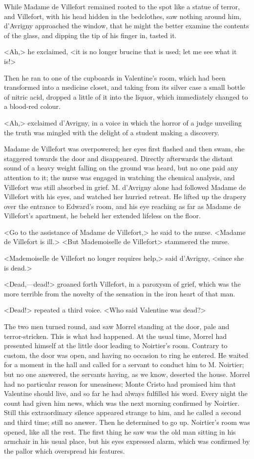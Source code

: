  While Madame de Villefort remained rooted to the spot like a statue of terror, and Villefort, with his head hidden in the bedclothes, saw nothing around him, d'Avrigny approached the window, that he might the better examine the contents of the glass, and dipping the tip of his finger in, tasted it. 

 <Ah,> he exclaimed, <it is no longer brucine that is used; let me see what it is!> 

 Then he ran to one of the cupboards in Valentine's room, which had been transformed into a medicine closet, and taking from its silver case a small bottle of nitric acid, dropped a little of it into the liquor, which immediately changed to a blood-red colour. 

 <Ah,> exclaimed d'Avrigny, in a voice in which the horror of a judge unveiling the truth was mingled with the delight of a student making a discovery. 

 Madame de Villefort was overpowered; her eyes first flashed and then swam, she staggered towards the door and disappeared. Directly afterwards the distant sound of a heavy weight falling on the ground was heard, but no one paid any attention to it; the nurse was engaged in watching the chemical analysis, and Villefort was still absorbed in grief. M. d'Avrigny alone had followed Madame de Villefort with his eyes, and watched her hurried retreat. He lifted up the drapery over the entrance to Edward's room, and his eye reaching as far as Madame de Villefort's apartment, he beheld her extended lifeless on the floor. 

 <Go to the assistance of Madame de Villefort,> he said to the nurse. <Madame de Villefort is ill.>  <But Mademoiselle de Villefort\longdash> stammered the nurse. 

 <Mademoiselle de Villefort no longer requires help,> said d'Avrigny, <since she is dead.> 

 <Dead,—dead!> groaned forth Villefort, in a paroxysm of grief, which was the more terrible from the novelty of the sensation in the iron heart of that man. 

 <Dead!> repeated a third voice. <Who said Valentine was dead?> 

 The two men turned round, and saw Morrel standing at the door, pale and terror-stricken. This is what had happened. At the usual time, Morrel had presented himself at the little door leading to Noirtier's room. Contrary to custom, the door was open, and having no occasion to ring he entered. He waited for a moment in the hall and called for a servant to conduct him to M. Noirtier; but no one answered, the servants having, as we know, deserted the house. Morrel had no particular reason for uneasiness; Monte Cristo had promised him that Valentine should live, and so far he had always fulfilled his word. Every night the count had given him news, which was the next morning confirmed by Noirtier. Still this extraordinary silence appeared strange to him, and he called a second and third time; still no answer. Then he determined to go up. Noirtier's room was opened, like all the rest. The first thing he saw was the old man sitting in his armchair in his usual place, but his eyes expressed alarm, which was confirmed by the pallor which overspread his features. 


